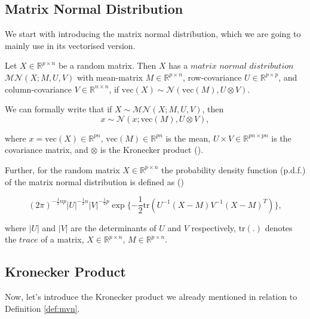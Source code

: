 \documentclass{mldsmsc}
\begin{document}
\subsection{Matrix Normal Distribution}

We start with introducing the matrix normal distribution, which we are going to mainly use in its vectorised version.

\begin{definition} \label{def:mvn}
    Let $X \in \mathbb{R}^{p \times n}$ be a random matrix. Then $X$ has a $\textit{matrix normal distribution}$ $\mathcal{MN}(X; M, U, V)$ with mean-matrix $M \in \mathbb{R}^{p \times n}$, row-covariance $U \in \mathbb{R}^{p \times p}$, and column-covariance $V \in \mathbb{R}^{n \times n}$, if $\text{vec}(X) \sim \mathcal{N}(\text{vec}(M), U \otimes V)$.
\end{definition}

\noindent We can formally write that if $X \sim \mathcal{MN}(X; M, U, V)$, then 
\begin{equation} \label{eq:mndvec}
    x \sim \mathcal{N}(x; \text{vec}(M), U \otimes V),
\end{equation}

\noindent where $x = \text{vec}(X) \in \mathbb{R}^{pn}$, $\text{vec}(M) \in \mathbb{R}^{pn}$ is the mean, $U \times V \in \mathbb{R}^{pn \times pn}$ is the covariance matrix, and $\otimes$ is the Kronecker product (\cite{gupta}). \newline

\noindent Further, for the random matrix $X \in \mathbb{R}^{p \times n}$ the probability density function (p.d.f.) of the matrix normal distribution is defined as (\cite{gupta})

\begin{equation}
    (2\pi)^{-\frac{1}{2}np} |U|^{-\frac{1}{2}n} |V|^{-\frac{1}{2}p} \exp{\{-\frac{1}{2}\text{tr}(U^{-1}(X - M)V^{-1}(X - M)^{T})\}},
\end{equation}

\noindent where $|U|$ and $|V|$ are the determinants of $U$ and $V$ respectively, $\text{tr}(.)$ denotes the $\textit{trace}$ of a matrix, $X \in \mathbb{R}^{p \times n}$, $M \in \mathbb{R}^{p \times n}$.

\subsection{Kronecker Product}

Now, let's introduce the Kronecker product we already mentioned in relation to Definition \ref{def:mvn}.
\end{document}
